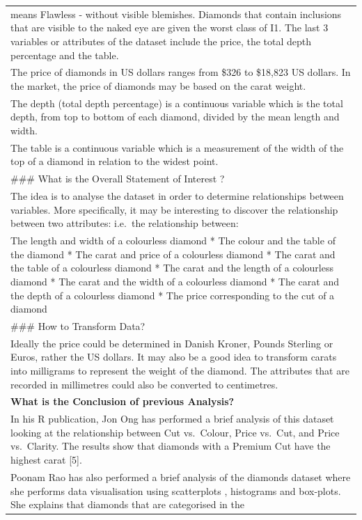 \documentclass[
]{article}
\begin{document}
\begin{longtable}[]{@{}
  >{\raggedright\arraybackslash}p{}@{}}
means Flawless - without visible blemishes. Diamonds that contain
inclusions that are visible to the naked eye are given the worst class
of I1. The last 3 variables or attributes of the dataset include the
price, the total depth percentage and the table. \\
The price of diamonds in US dollars ranges from \$326 to \$18,823 US
dollars. In the market, the price of diamonds may be based on the carat
weight. \\
The depth (total depth percentage) is a continuous variable which is the
total depth, from top to bottom of each diamond, divided by the mean
length and width. \\
The table is a continuous variable which is a measurement of the width
of the top of a diamond in relation to the widest point. \\
\#\#\# What is the Overall Statement of Interest ? \\
The idea is to analyse the dataset in order to determine relationships
between variables. More specifically, it may be interesting to discover
the relationship between two attributes: i.e.~the relationship
between: \\
* The length and width of a colourless diamond * The colour and the
table of the diamond * The carat and price of a colourless diamond * The
carat and the table of a colourless diamond * The carat and the length
of a colourless diamond * The carat and the width of a colourless
diamond * The carat and the depth of a colourless diamond * The price
corresponding to the cut of a diamond \\
\#\#\# How to Transform Data? \\
Ideally the price could be determined in Danish Kroner, Pounds Sterling
or Euros, rather the US dollars. It may also be a good idea to transform
carats into milligrams to represent the weight of the diamond. The
attributes that are recorded in millimetres could also be converted to
centimetres. \\
\textbf{What is the Conclusion of previous Analysis?} \\
In his R publication, Jon Ong has performed a brief analysis of this
dataset looking at the relationship between Cut vs.~Colour, Price
vs.~Cut, and Price vs.~Clarity. The results show that diamonds with a
Premium Cut have the highest carat {[}5{]}. \\
Poonam Rao has also performed a brief analysis of the diamonds dataset
where she performs data visualisation using scatterplots , histograms
and box-plots. She explains that diamonds that are categorised in the

\end{longtable}
\end{document}
